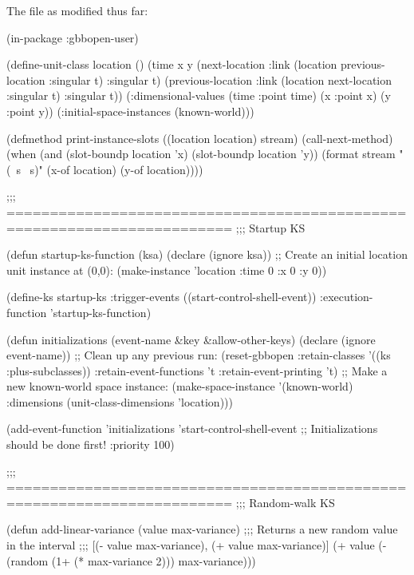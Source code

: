 \documentclass[10pt,twoside,english,pdftex]{article}
\begin{document}
\begin{tightitemize}
\item The  file as modified thus far:

\begin{example}
  (in-package :gbbopen-user)

  (define-unit-class location ()
    (time 
     x y
     (next-location
      :link (location previous-location :singular t) 
      :singular t)
     (previous-location
      :link (location next-location :singular t)  
      :singular t))
    (:dimensional-values
      (time :point time)
      (x :point x)
      (y :point y))
    (:initial-space-instances (known-world)))

  (defmethod print-instance-slots ((location location) stream)
    (call-next-method)
    (when (and (slot-boundp location 'x)
               (slot-boundp location 'y))
      (format stream " (~s ~s)"
              (x-of location)
              (y-of location))))

  ;;; ========================================================================
  ;;;   Startup KS

  (defun startup-ks-function (ksa)
    (declare (ignore ksa))
    ;; Create an initial location unit instance at (0,0):
    (make-instance 'location :time 0 :x 0 :y 0))

  (define-ks startup-ks
      :trigger-events ((start-control-shell-event))
      :execution-function 'startup-ks-function)

  (defun initializations (event-name &key &allow-other-keys)
    (declare (ignore event-name))
    ;; Clean up any previous run:
    (reset-gbbopen :retain-classes '((ks :plus-subclasses))
                   :retain-event-functions 't
                   :retain-event-printing 't)
    ;; Make a new known-world space instance:
    (make-space-instance 
     '(known-world)
     :dimensions (unit-class-dimensions 'location)))

  (add-event-function 'initializations 'start-control-shell-event
                      ;; Initializations should be done first!
                      :priority 100)

  ;;; ========================================================================
  ;;;   Random-walk KS

  (defun add-linear-variance (value max-variance)
    ;;; Returns a new random value in the interval
    ;;; [(- value max-variance), (+ value max-variance)]
    (+ value (- (random (1+ (* max-variance 2))) max-variance)))


\end{example}
\end{tightitemize}
\end{document}
